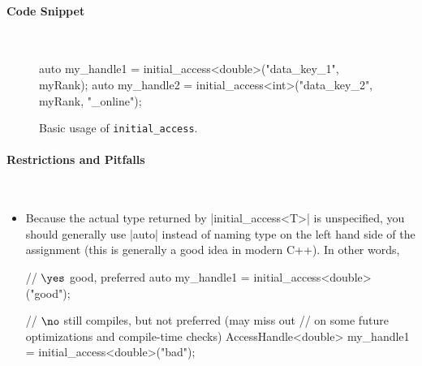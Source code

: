 \paragraph{Code Snippet}\mbox{}\\
\begin{figure}[!h]
\begin{CppCodeNumb}
  auto my_handle1 = initial_access<double>("data_key_1", myRank);
  auto my_handle2 = initial_access<int>("data_key_2", myRank, "_online");
\end{CppCodeNumb}
\label{fig:fe_api_initialaccess}
\caption{Basic usage of \lstinline|initial_access|.}
\end{figure}

\paragraph{Restrictions and Pitfalls}\mbox{}\\ 
\begin{itemize}
  \item Because the actual type returned by |initial_access<T>| is
  unspecified, you should generally use |auto| instead of naming type on 
  the left hand side of the assignment (this is generally a good idea in modern
  C++). In other words,
  \begin{CppCode}
	// $\yes$ good, preferred
	auto my_handle1 = initial_access<double>("good"); 

	// $\no$ still compiles, but not preferred (may miss out
	//  on some future optimizations and compile-time checks)
	AccessHandle<double> my_handle1 = initial_access<double>("bad"); 
  \end{CppCode}
\end{itemize}



